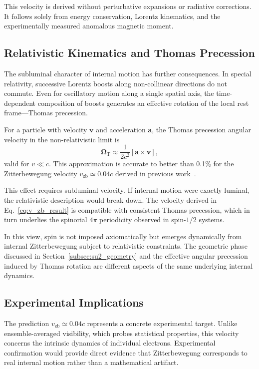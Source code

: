 \documentclass[%
 reprint,
 amsmath,amssymb,
 aps,
 prb,
]{revtex4-2}
\numberwithin{equation}{section}
\begin{document}
This velocity is derived without perturbative expansions or radiative corrections. It follows solely from energy conservation, Lorentz kinematics, and the experimentally measured anomalous magnetic moment.


\subsection{Relativistic Kinematics and Thomas Precession}
\label{subsec:thomas_precession}

The subluminal character of internal motion has further consequences. In special relativity, successive Lorentz boosts along non-collinear directions do not commute. Even for oscillatory motion along a single spatial axis, the time-dependent composition of boosts generates an effective rotation of the local rest frame---Thomas precession.

For a particle with velocity $\mathbf{v}$ and acceleration $\mathbf{a}$, 
the Thomas precession angular velocity in the non-relativistic limit is
\begin{equation}
\boldsymbol{\Omega}_{\mathrm{T}} \approx \frac{1}{2c^2}[\mathbf{a} \times \mathbf{v}],
\label{eq:thomas_formula}
\end{equation}
valid for $v \ll c$. This approximation is accurate to better than 
0.1\% for the Zitterbewegung velocity $v_{\mathrm{zb}} \simeq 0.04c$ 
derived in previous work~\cite{zenodo.16905633}.

This effect requires subluminal velocity. If internal motion were exactly luminal, the relativistic description would break down. The velocity derived in Eq.~\eqref{eq:v_zb_result} is compatible with consistent Thomas precession, which in turn underlies the spinorial $4\pi$ periodicity observed in spin-$1/2$ systems.

In this view, spin is not imposed axiomatically but emerges dynamically from internal Zitterbewegung subject to relativistic constraints. The geometric phase discussed in Section~\ref{subsec:su2_geometry} and the effective angular precession induced by Thomas rotation are different aspects of the same underlying internal dynamics.


\subsection{Experimental Implications}
\label{subsec:experimental_implications}

The prediction $v_{\mathrm{zb}} \simeq 0.04c$ represents a concrete experimental target. Unlike ensemble-averaged visibility, which probes statistical properties, this velocity concerns the intrinsic dynamics of individual electrons. Experimental confirmation would provide direct evidence that Zitterbewegung corresponds to real internal motion rather than a mathematical artifact.
\end{document}
